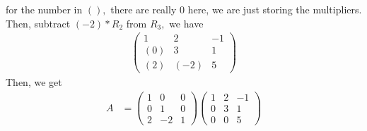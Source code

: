 \documentclass[11pt,oneside]{book}
\theoremstyle{break}
\theoremstyle{break}
\begin{document}
for the number in $(),$ there are really 0 here, we are just storing the multipliers. Then, subtract $(-2)*R_2$ from $R_3,$ we have \begin{align*}
\begin{pmatrix}
1&2&-1\\
(0)&3&1\\
(2)&(-2)&5
\end{pmatrix}
\end{align*}
Then, we get \begin{align*}
A&=\begin{pmatrix}
1&0&0\\
0&1&0\\
2&-2&1
\end{pmatrix}\begin{pmatrix}
1&2&-1\\
0&3&1\\
0&0&5
\end{pmatrix}
\end{align*}
\end{document}

